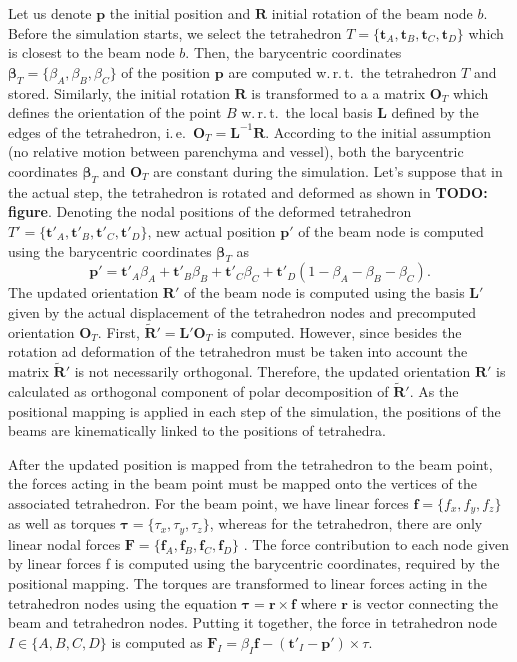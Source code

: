 \documentclass[final,3p,times,twocolumn]{elsarticle}
\def\wrt{w.\,r.\,t.\ }
\def\ie{i.\,e.\ }
\newcommand{\TODO}[1]{{\color{red}\textbf{TODO: #1}}}
\renewcommand{\Vec}[1]{\boldsymbol{#1}}
\newcommand{\Mat}[1]{\boldsymbol{#1}}
\begin{document}
Let us denote $\Vec{p}$ the initial position and $\Mat{R}$ initial rotation
of the beam node $b$. Before the simulation starts, we select the
tetrahedron $T = \{\Vec{t}_A, \Vec{t}_B, \Vec{t}_C, \Vec{t}_D \}$ which is
closest to the beam node $b$. Then, the barycentric coordinates
$\Vec{\beta}_T = \{\beta_A, \beta_B, \beta_C\}$ of the position $\Vec{p}$
are computed \wrt the tetrahedron $T$ and stored. Similarly, the initial
rotation $\Mat{R}$ is transformed to a a matrix $\Mat{O}_T$ which defines
the orientation of the point $B$ \wrt the local basis $\Mat{L}$ defined by
the edges of the tetrahedron, \ie $\Mat{O}_T = \Mat{L}^{-1} \Mat{R}$.
According to the initial assumption (no relative motion between parenchyma
and vessel), both the barycentric coordinates $\Vec{\beta}_T$ and
$\Mat{O}_T$ are constant during the simulation. Let's suppose that in  the
actual step, the tetrahedron is rotated and deformed as shown in
\TODO{figure}. Denoting the nodal positions of the deformed tetrahedron $T'
= \{\Vec{t}'_A, \Vec{t}'_B, \Vec{t}'_C, \Vec{t}'_D\}$, new actual position
$\Vec{p}'$  of the beam node is computed using the barycentric coordinates
$\Vec{\beta}_T$ as
%
\begin{equation}
  \Vec{p}' = \Vec{t}'_A \beta_A + \Vec{t}'_B \beta_B + \Vec{t}'_C \beta_C +
  \Vec{t}'_D (1 - \beta_A - \beta_B - \beta_C).
\end{equation}
%
The updated orientation $\Mat{R}'$ of the beam node is computed using the
basis $\Mat{L}'$ given by the actual displacement of the tetrahedron nodes
and precomputed orientation $\Mat{O}_T$. First, $\Mat{\tilde{R}}' =
\Mat{L}' \Mat{O}_T$ is computed. However, since besides the rotation ad
deformation of the tetrahedron must be taken into account the matrix
$\Mat{\tilde{R}}'$ is not necessarily orthogonal. Therefore, the updated
orientation $\Mat{R}'$ is calculated as orthogonal component of polar
decomposition of $\Mat{\tilde{R}}'$. As the positional mapping is applied
in each step of the simulation, the positions of the beams are
kinematically linked to the positions of tetrahedra.

After the updated position is mapped from the tetrahedron to the beam point,
the forces acting in the beam point must be mapped onto the vertices of the
associated tetrahedron. For the beam point, we have linear forces $\Vec{f}
= \{ f_x , f_y , f_z \}$
as well as torques $\Vec{\tau} = \{ \tau_x, \tau_y, \tau_z \}$, whereas for the tetrahedron, there are only
linear nodal forces $\Mat{F} = \{ \Vec{f}_A , \Vec{f}_B , \Vec{f}_C ,
\Vec{f}_D \}$ . The force contribution to each node
given by linear forces f is computed using the barycentric coordinates, required
by the positional mapping. The torques are transformed to linear forces acting in
the tetrahedron nodes using the equation $\Vec{\tau} = \Vec{r} \times
\Vec{f}$ where $\Vec{r}$ is vector connecting
the beam and tetrahedron nodes. Putting it together, the force in tetrahedron
node $I \in \{A, B, C, D\}$ is computed as $\Vec{F}_I = \beta_I \Vec{f} −
(\Vec{t}'_I − \Vec{p}') \times \tau$.
\end{document}
